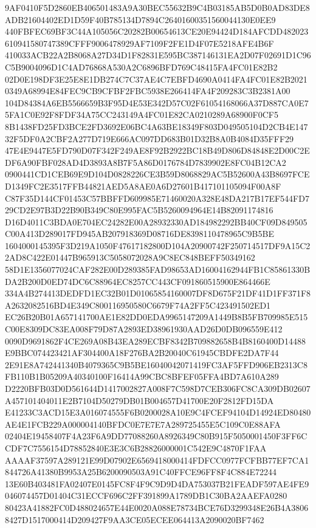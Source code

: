\documentclass[UTF8,fontset=fandol,zihao=-4,a4paper]{ctexart}
\begin{document}
{{9AF0410F5D2860EB406501483A9A30BEC55632B9C4B03185AB5D0B0AD83DE8ADB21604402ED1D59F40B785134D7894C26401600351560044130E0EE9
440FBFEC69BF3C44A105056C20282B00654613CE20E94424D184AFCDD482023610941580747389CFFF9006478929AF7109F2FE1D4F07E5218AFE4B6F
410033ACB22A2B8068A27D34D1F82831E595BC387146131EA2D07F02691D1C96C5B9004096D1C4AD76868A530A2C6896BFD769C48415FA4FC01E82B2
02D0E198DF3E25E8E1DB274C7C37AE4C7EBFD4690A0414FA4FC01E82B20210349A68994E84FEC9CB9CFBF2FBC5938E266414FA4F209283C3B2381A00
104D84384A6EB5566659B3F95D4E53E342D57C02F61054168066A37D887CA0E75FA1C0E92F8FDF34A75CC243149A4FC01E82CA0210289A68900F0CF5
8B1438FD25FD3BCE2FD3692E06BC4A63BE18349F803D049505104D2CB4E14732F5DF0A2CBF2A277D719E666AC097DD683B01D32B8A0B4084D35FFF29
47E4E9447E5FD790D07F342F249AE8F92B2922BC18B49D806D84848E2D00C2EDF6A90FBF028AD4D3893A8B7F5A86D0176784D7839902E8FC04B12CA2
0900441CD1CEB69E9D104D0828226CE3B59D8068829AC5B52600A43B8697FCED1349FC2E3517FFB44821AED5A8AE0A6D27601B417101105094F00A8F
C87F35D144CF01453C57BBFFD609985E71460020A328E48DA217B17EF544FD729CD2E97B3D22B90B349C80E995FAC5B5260094964E14B82091174816
D16D4011C3BDA0E704EC24282E00A28932330AD184982292BB40CF09D849505C00A413D289017FD945AB207918369D08716DE8398110478965C9B5BE
1604000145395F3D219A1050F47617182800D104A20900742F250714517DF9A15C22AD8C422E01447B965913C5058072028A9C8EC848BEFF50349162
58D1E1356077024CAF282E00D289385FAD98653AD16004162944FB1C85861330BDA2B200D0ED74DC6C88964EC8257CC443CF091860515900E864466E
334A4B274413DEDFD1EC32B01D01065854160007DF8D675F21DF41D1FF371F8A2632082516BD4E349C800116950580C6679F74A2FF5C423491502ED1
EC26B20B01A657141700AE1E82DD0EDA9965147209A1449B8B5FB709985E515C00E8309DC83EA008F79D87A2893ED38961930AAD26D0DB096559E412
0090D9691862F4CE269A08B43EA289ECBF8342B709882658B4B8160400D14488E9BBC074423421AF304400A18F276BA2B20040C61945CBDFE2DA7F44
2E91E8A742441340B4079365C9B5BE16040042071419FC3AF5FFD906EB2313C8FB110B1B05209A40340100F16414A99CBC8BFEF05FFA4BD7A610A289
D2220BFB03D0D561644D1417002827A008F7C598D7CEB306FC8CA309DB02607A457101404011E2B7104D50279DB01B004657D41700E20F2812FD15DA
E41233C3ACD15E3A016074555F6B0200028A10E9C4FCEF94104D14924ED80480AE4E1FCB229A000004140BFDC0E7E7E7A289725455E5C109C0E88AFA
02404E19458407F4A23F6A9DD77088260A8926349C80B915F5050001450F3FF6CCDF7C7556154D78852840E3E3C6B28826000001C542E9C4870F1FAA
AAAAF37597A289121E99D07902E6569418000414FDFCC0977FCFBB77EF7CA1844726A41380B9953A25B6200090503A91C40FFCE96FF8F4C884E72244
13E60B403481FA02407E0145FC8F4F9C9D9D4DA753037B21FEADF597AE4FE9046074457D01404C31ECCF696C2FF391899A1789DB1C30BA2AAEFA0280
80423A41882FC0D488024657E44E0020A088E78734BCE76D3299348E26B4A38068427D1517000414D209427F9AA3CE05ECEE064413A2090020BF7462
}}
\end{document}

